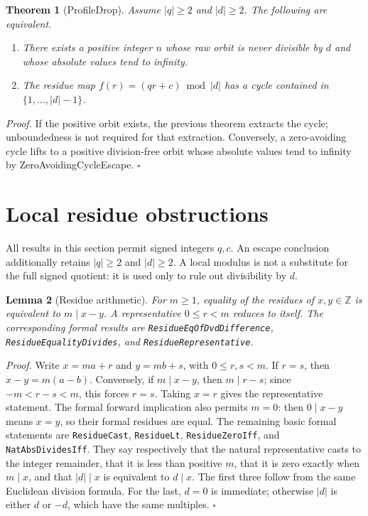 \documentclass[11pt,letterpaper]{article}
\newcommand{\Z}{\mathbb{Z}}
\newtheorem{theorem}{Theorem}
\newtheorem{lemma}[theorem]{Lemma}
\newenvironment{proof}{\noindent\textit{Proof.}}{\hfill\(\square\)}
\begin{document}
\begin{theorem}[ProfileDrop]
Assume \(|q|\ge 2\) and \(|d|\ge 2\). The following are equivalent.
\begin{enumerate}
  \item There exists a positive integer \(n\) whose raw orbit is never divisible by \(d\) and whose absolute values tend to infinity.
  \item The residue map \(f(r)=(qr+c)\bmod |d|\) has a cycle contained in \(\{1,\ldots,|d|-1\}\).
\end{enumerate}
\end{theorem}

\begin{proof}
If the positive orbit exists, the previous theorem extracts the cycle; unboundedness is not required for that extraction. Conversely, a zero-avoiding cycle lifts to a positive division-free orbit whose absolute values tend to infinity by ZeroAvoidingCycleEscape.
\end{proof}

\section{Local residue obstructions}

All results in this section permit signed integers \(q,c\).
An escape conclusion additionally retains \(|q|\ge2\) and \(|d|\ge2\).
A local modulus is not a substitute for the full signed quotient: it is
used only to rule out divisibility by \(d\).

\begin{lemma}[Residue arithmetic]
For \(m\ge1\), equality of the residues of \(x,y\in\Z\) is equivalent to
\(m\mid x-y\). A representative \(0\le r<m\) reduces to itself.
The corresponding formal results are \texttt{Residue\allowbreak Eq\allowbreak Of\allowbreak Dvd\allowbreak Difference},
\texttt{Residue\allowbreak Equality\allowbreak Divides}, and \texttt{Residue\allowbreak Representative}.
\end{lemma}

\begin{proof}
Write \(x=ma+r\) and \(y=mb+s\), with \(0\le r,s<m\).
If \(r=s\), then \(x-y=m(a-b)\). Conversely, if \(m\mid x-y\),
then \(m\mid r-s\); since \(-m<r-s<m\), this forces \(r=s\).
Taking \(x=r\) gives the representative statement.
The formal forward implication also permits \(m=0\): then
\(0\mid x-y\) means \(x=y\), so their formal residues are equal.
The remaining basic formal statements are
\texttt{Residue\allowbreak Cast}, \texttt{Residue\allowbreak Lt}, \texttt{Residue\allowbreak Zero\allowbreak Iff}, and
\texttt{Nat\allowbreak Abs\allowbreak Divides\allowbreak Iff}. They say respectively that the natural
representative casts to the integer remainder, that it is less than
positive \(m\), that it is zero exactly when \(m\mid x\), and that
\(|d|\mid x\) is equivalent to \(d\mid x\). The first three follow
from the same Euclidean division formula. For the last, \(d=0\)
is immediate; otherwise \(|d|\) is either \(d\) or \(-d\), which
have the same multiples.
\end{proof}
\end{document}

